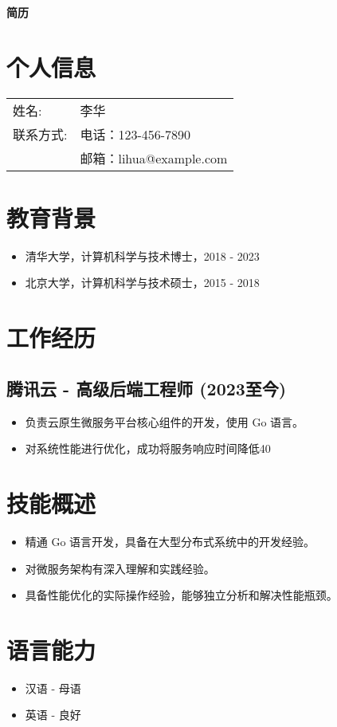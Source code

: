 \documentclass[a4paper,12pt]{article}
\begin{document}
\pagestyle{empty}

\begin{center}
    \textbf{\Large 简历}
\end{center}

\vspace{2mm}

\section*{个人信息}
\begin{tabular}{@{} l l}
  姓名: & 李华 \\
  联系方式: & 电话：123-456-7890 \\
            & 邮箱：lihua@example.com \\
\end{tabular}

\section*{教育背景}
\begin{itemize}
  \item 清华大学，计算机科学与技术博士，2018 - 2023
  \item 北京大学，计算机科学与技术硕士，2015 - 2018
\end{itemize}

\section*{工作经历}
\subsection*{腾讯云 - 高级后端工程师 (2023至今)}
\begin{itemize}
  \item 负责云原生微服务平台核心组件的开发，使用 Go 语言。
  \item 对系统性能进行优化，成功将服务响应时间降低40%
\end{itemize}

\section*{技能概述}
\begin{itemize}
  \item 精通 Go 语言开发，具备在大型分布式系统中的开发经验。
  \item 对微服务架构有深入理解和实践经验。
  \item 具备性能优化的实际操作经验，能够独立分析和解决性能瓶颈。
\end{itemize}

\section*{语言能力}
\begin{itemize}
  \item 汉语 - 母语
  \item 英语 - 良好
\end{itemize}
\end{document}
